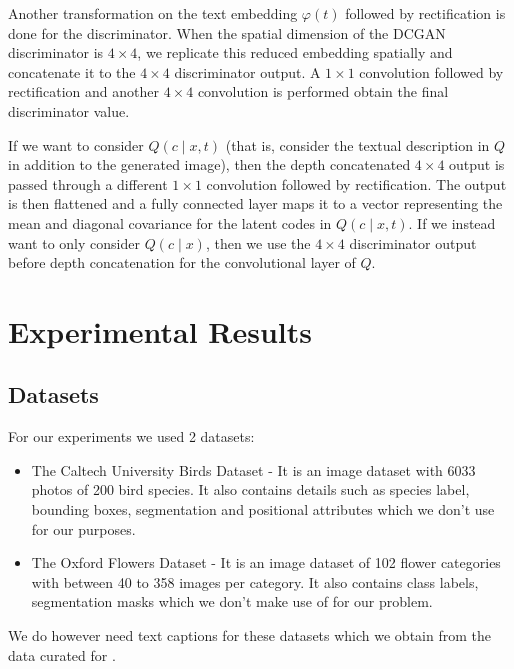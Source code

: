 \documentclass{article}
\begin{document}
Another transformation on the text embedding $\varphi(t)$ followed by rectification is done for the discriminator. When the spatial dimension of the DCGAN discriminator is $4\times 4$, we replicate this reduced embedding spatially and concatenate it to the $4\times 4$ discriminator output. A $1\times 1$ convolution followed by rectification and another $4\times 4$ convolution is performed obtain the final discriminator value.

If we want to consider $Q(c\mid x,t)$ (that is, consider the textual description in $Q$ in addition to the generated image), then the depth concatenated $4\times 4$ output is passed through a different $1\times 1$ convolution followed by rectification. The output is then flattened and a fully connected layer maps it to a vector representing the mean and diagonal covariance for the latent codes in $Q(c\mid x,t)$. If we instead want to only consider $Q(c\mid x)$, then we use the $4\times 4$ discriminator output before depth concatenation for the convolutional layer of $Q$.




\section{Experimental Results}
\subsection{Datasets}
For our experiments we used 2 datasets: 
\begin{itemize}
    \item The Caltech University Birds Dataset \cite{cub} - It is an image
        dataset with 6033 photos of 200 bird species. It also contains details
        such as species label, bounding boxes, segmentation and positional
        attributes which we don't use for our purposes.
    \item The Oxford Flowers Dataset \cite{flowers} - It is an image dataset of
        102 flower categories with between 40 to 358 images per category. It
        also contains class labels, segmentation masks which we don't make use
        of for our problem.
\end{itemize}
We do however need text captions for these datasets which we obtain from the data
curated for \cite{visualdesc}.
\end{document}
